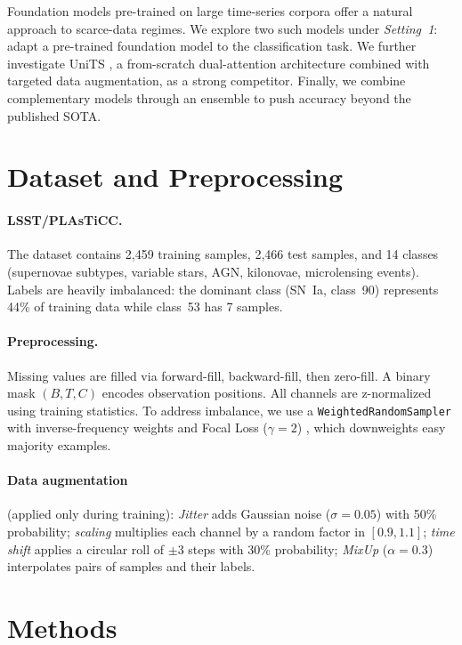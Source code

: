 \documentclass{article}
\begin{document}
Foundation models pre-trained on large time-series corpora offer a natural
approach to scarce-data regimes. We explore two such models under
\emph{Setting~1}: adapt a pre-trained foundation model to the classification
task. We further investigate UniTS \citep{units}, a from-scratch dual-attention
architecture combined with targeted data augmentation, as a strong competitor.
Finally, we combine complementary models through an ensemble to push accuracy
beyond the published SOTA.

\section{Dataset and Preprocessing}

\paragraph{LSST/PLAsTiCC.}
The dataset contains 2,459 training samples, 2,466 test samples, and 14 classes
(supernovae subtypes, variable stars, AGN, kilonovae, microlensing events).
Labels are heavily imbalanced: the dominant class (SN~Ia, class~90) represents
44\% of training data while class~53 has 7 samples.

\paragraph{Preprocessing.}
Missing values are filled via forward-fill, backward-fill, then zero-fill. A
binary mask $(B,T,C)$ encodes observation positions. All channels are
z-normalized using training statistics. To address imbalance, we use a
\texttt{WeightedRandomSampler} with inverse-frequency weights and
Focal Loss ($\gamma=2$) \citep{focal}, which downweights easy majority examples.

\paragraph{Data augmentation} (applied only during training):
\emph{Jitter} adds Gaussian noise ($\sigma{=}0.05$) with 50\% probability;
\emph{scaling} multiplies each channel by a random factor in $[0.9, 1.1]$;
\emph{time shift} applies a circular roll of $\pm 3$ steps with 30\%
probability; \emph{MixUp} ($\alpha{=}0.3$) interpolates pairs of samples and
their labels.

\section{Methods}
\end{document}
